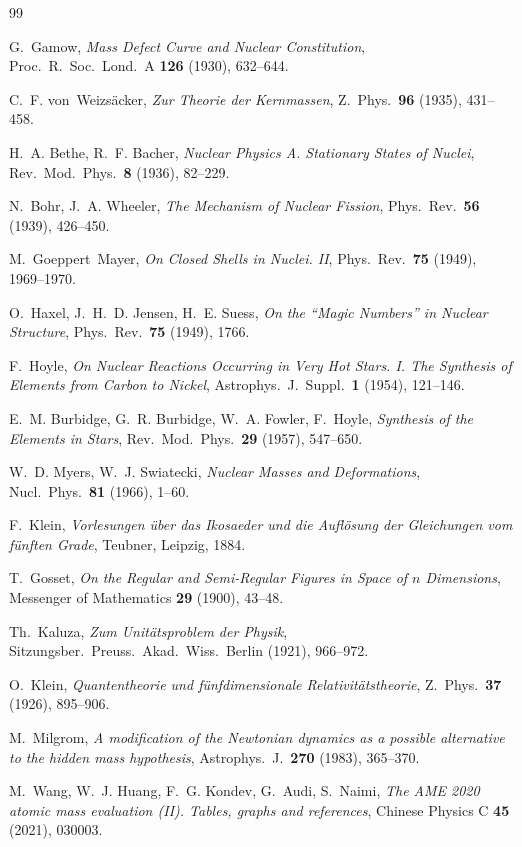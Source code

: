 \documentclass[11pt,a4paper]{article}
\theoremstyle{definition}
\theoremstyle{remark}
\begin{document}
\begin{thebibliography}{99}

G.~Gamow, \emph{Mass Defect Curve and Nuclear Constitution}, Proc.\ R.\ Soc.\ Lond.\ A \textbf{126} (1930), 632--644.

C.~F. von~Weizsäcker, \emph{Zur Theorie der Kernmassen}, Z.\ Phys.\ \textbf{96} (1935), 431--458.

H.~A. Bethe, R.~F. Bacher, \emph{Nuclear Physics A. Stationary States of Nuclei}, Rev.\ Mod.\ Phys.\ \textbf{8} (1936), 82--229.

N.~Bohr, J.~A. Wheeler, \emph{The Mechanism of Nuclear Fission}, Phys.\ Rev.\ \textbf{56} (1939), 426--450.

M.~Goeppert~Mayer, \emph{On Closed Shells in Nuclei. II}, Phys.\ Rev.\ \textbf{75} (1949), 1969--1970.

O.~Haxel, J.~H.~D. Jensen, H.~E. Suess, \emph{On the ``Magic Numbers'' in Nuclear Structure}, Phys.\ Rev.\ \textbf{75} (1949), 1766.

F.~Hoyle, \emph{On Nuclear Reactions Occurring in Very Hot Stars. I. The Synthesis of Elements from Carbon to Nickel}, Astrophys.\ J.\ Suppl.\ \textbf{1} (1954), 121--146.

E.~M. Burbidge, G.~R. Burbidge, W.~A. Fowler, F.~Hoyle, \emph{Synthesis of the Elements in Stars}, Rev.\ Mod.\ Phys.\ \textbf{29} (1957), 547--650.

W.~D. Myers, W.~J. Swiatecki, \emph{Nuclear Masses and Deformations}, Nucl.\ Phys.\ \textbf{81} (1966), 1--60.

F.~Klein, \emph{Vorlesungen über das Ikosaeder und die Auflösung der Gleichungen vom fünften Grade}, Teubner, Leipzig, 1884.

T.~Gosset, \emph{On the Regular and Semi-Regular Figures in Space of \(n\) Dimensions}, Messenger of Mathematics \textbf{29} (1900), 43--48.

Th.~Kaluza, \emph{Zum Unitätsproblem der Physik}, Sitzungsber.\ Preuss.\ Akad.\ Wiss.\ Berlin (1921), 966--972.

O.~Klein, \emph{Quantentheorie und fünfdimensionale Relativitätstheorie}, Z.\ Phys.\ \textbf{37} (1926), 895--906.

M.~Milgrom, \emph{A modification of the Newtonian dynamics as a possible alternative to the hidden mass hypothesis}, Astrophys.\ J.\ \textbf{270} (1983), 365--370.

M.~Wang, W.~J. Huang, F.~G. Kondev, G.~Audi, S.~Naimi, \emph{The AME 2020 atomic mass evaluation (II). Tables, graphs and references}, Chinese Physics C \textbf{45} (2021), 030003.

\end{thebibliography}
\end{document}
